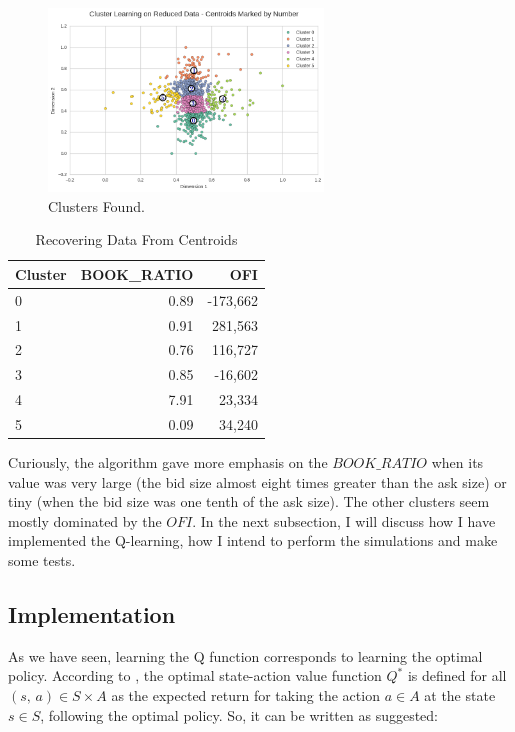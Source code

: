 \documentclass[a4paper]{article}
\begin{document}
\begin{figure}[ht]
\centering
\includegraphics[width=0.65\textwidth]{figures/cluster_scatter.png}
\caption{\label{fig:clusters}Clusters Found.}
\end{figure}

\begin{table}[ht!]
\centering
\begin{tabular}{l|rr}
{Cluster} &    BOOK\_RATIO &    OFI \\
\midrule
0 &  0.89 &  -173,662 \\
1 &  0.91 &  281,563 \\
2 &  0.76 &  116,727 \\
3 &  0.85 &  -16,602 \\
4 &  7.91 &  23,334 \\
5 &  0.09 &  34,240 \\

\end{tabular}
\caption{\label{tab:cluster_recover}Recovering Data From Centroids}
\end{table}

Curiously, the algorithm gave more emphasis on the $BOOK\_RATIO$  when its value was very large (the bid size almost eight times greater than the ask size) or tiny (when the bid size was one tenth of the ask size). The other clusters seem mostly dominated by the $OFI$. In the next subsection, I will discuss how I have implemented the Q-learning, how I intend to perform the simulations and make some tests.


\subsection{Implementation}
As we have seen, learning the Q function corresponds to learning the optimal policy. According to \cite{Mohri_2012}, the optimal state-action value function $Q^{*}$ is defined for all $(s, \, a) \in S \times A$ as the expected return for taking the action $a \in A$ at the state $s \in S$, following the optimal policy. So, it can be written as \cite{Mitchell} suggested:
\end{document}
